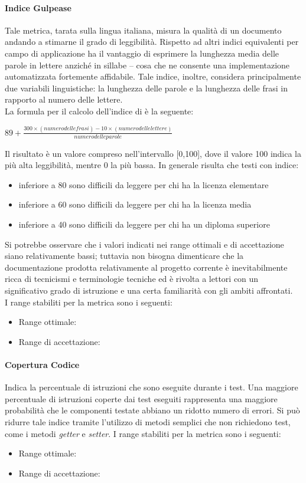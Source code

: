 			\paragraph{Indice Gulpease}
			Tale metrica, tarata sulla lingua italiana, misura la qualità di un documento andando a stimarne il grado di leggibilità. Rispetto ad altri indici equivalenti per campo di applicazione ha il vantaggio di esprimere la lunghezza media delle parole in lettere anziché in sillabe – cosa che ne consente una implementazione automatizzata fortemente affidabile. Tale indice, inoltre, considera principalmente due variabili linguistiche: la lunghezza delle parole e la lunghezza delle frasi in rapporto al numero delle lettere.
\\La formula per il calcolo dell'indice di  è la seguente:
			\begin{center}
			$89+\frac{300\times(numero delle frasi)-10\times(numero delle lettere)}{numero delle parole}$
			\end{center}
Il risultato è un valore compreso nell'intervallo [0,100], dove il valore 100 indica la più alta leggibilità, mentre 0 la più bassa. In generale risulta che testi con indice:
			\begin{itemize}
			\item inferiore a 80 sono difficili da leggere per chi ha la licenza elementare
			\item inferiore a 60 sono difficili da leggere per chi ha la licenza media
			\item inferiore a 40 sono difficili da leggere per chi ha un diploma superiore	
			\end{itemize}
Si potrebbe osservare che i valori indicati nei range ottimali e di accettazione siano relativamente bassi; tuttavia non bisogna dimenticare che la documentazione prodotta relativamente al progetto corrente è inevitabilmente ricca di tecnicismi e terminologie tecniche ed è rivolta a lettori con un significativo grado di istruzione e una certa familiarità con gli ambiti affrontati.
\\I range stabiliti per la metrica sono i seguenti:
			\begin{itemize}
					\item Range ottimale:
					\item Range di accettazione:
				\end{itemize}
				
			\paragraph{Copertura Codice}
			Indica la percentuale di istruzioni che sono eseguite durante i test. Una maggiore percentuale di istruzioni coperte dai test eseguiti rappresenta una maggiore probabilità che le componenti testate abbiano un ridotto numero di errori. Si può ridurre tale indice tramite l'utilizzo di metodi semplici che non richiedono test, come i metodi \textit{getter} e \textit{setter}.
			I range stabiliti per la metrica sono i seguenti:
			\begin{itemize}
					\item Range ottimale:
					\item Range di accettazione:
				\end{itemize}
				
